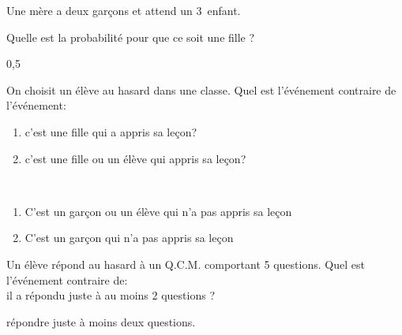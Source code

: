 \begin{exercice*}
Une mère a deux garçons et attend un 3\ieme\ enfant. 

Quelle est la probabilité pour que ce soit une fille ?
 \begin{corrige}
  0,5
 \end{corrige}
\end{exercice*}

\begin{exercice*}
On choisit un élève au hasard dans une classe. Quel est l'événement
contraire de l'événement: 
\begin{enumerate}
\item \og c'est une fille qui a appris sa leçon\fg ?
\item \og c'est une fille ou un élève qui appris sa
leçon\fg ?
\end{enumerate}
 \begin{corrige}
 ~\\
 \begin{enumerate}
 \item \og C'est un garçon ou un élève qui n'a pas appris sa leçon \fg
 \item \og C'est un garçon qui n'a pas appris sa leçon \fg
 \end{enumerate}  
 \end{corrige}
\end{exercice*}

\begin{exercice*}
Un élève répond au hasard à un Q.C.M. comportant 5 questions. Quel est
l'événement contraire de:\\ \og il a répondu juste à au moins 2
questions \fg ?
 \begin{corrige}
  \og répondre juste à moins deux questions.\fg
 \end{corrige}
\end{exercice*}



